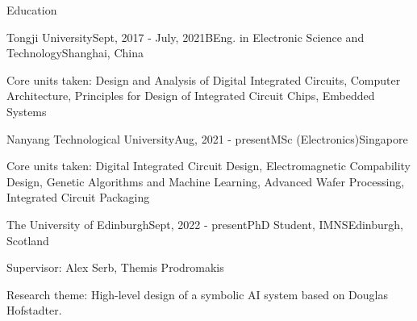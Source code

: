 \documentclass{resume} %
\begin{document}

\begin{rSection}{Education}
	
	\begin{rSubsection}{Tongji University}{Sept, 2017 - July, 2021}{BEng. in Electronic Science and Technology}{Shanghai, China}
		\item Core units taken: Design and Analysis of Digital Integrated Circuits, Computer Architecture, Principles for Design of Integrated Circuit Chips, Embedded Systems
	\end{rSubsection}

	\begin{rSubsection}{Nanyang Technological University}{Aug, 2021 - present}{MSc (Electronics)}{Singapore}
		\item Core units taken: Digital Integrated Circuit Design, Electromagnetic Compability Design, Genetic Algorithms and Machine Learning, Advanced Wafer Processing, Integrated Circuit Packaging
	\end{rSubsection}

	\begin{rSubsection}{The University of Edinburgh}{Sept, 2022 - present}{PhD Student, IMNS}{Edinburgh, Scotland}
		\item Supervisor: Alex Serb, Themis Prodromakis
		\item Research theme: High-level design of a symbolic AI system based on Douglas Hofstadter. 
	\end{rSubsection}

\end{rSection}
\end{document}

